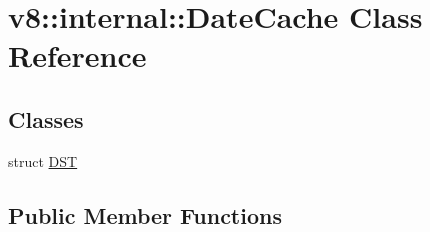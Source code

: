 \hypertarget{classv8_1_1internal_1_1_date_cache}{}\section{v8\+:\+:internal\+:\+:Date\+Cache Class Reference}
\label{classv8_1_1internal_1_1_date_cache}
\subsection*{Classes}
\begin{DoxyCompactItemize}
\item 
struct \hyperlink{structv8_1_1internal_1_1_date_cache_1_1_d_s_t}{D\+ST}
\end{DoxyCompactItemize}
\subsection*{Public Member Functions}
